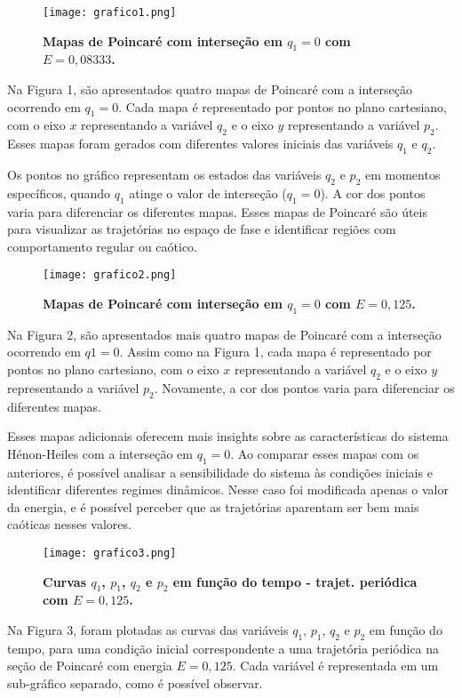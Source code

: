\documentclass[a4paper,12pt]{article}
\begin{document}
\begin{figure}[H]
\centering
\texttt{[image: grafico1.png]}
\caption{\textbf{Mapas de Poincaré com interseção em $q_1 = 0$ com $E = 0,08333$.}}
\end{figure}

Na Figura 1, são apresentados quatro mapas de Poincaré com a interseção ocorrendo em $q_1 = 0$. Cada mapa é representado por pontos no plano cartesiano, com o eixo $x$ representando a variável $q_2$ e o eixo $y$ representando a variável $p_2$. Esses mapas foram gerados com diferentes valores iniciais das variáveis $q_1$ e $q_2$.

Os pontos no gráfico representam os estados das variáveis $q_2$ e $p_2$ em momentos específicos, quando $q_1$ atinge o valor de interseção ($q_1 = 0$). A cor dos pontos varia para diferenciar os diferentes mapas. Esses mapas de Poincaré são úteis para visualizar as trajetórias no espaço de fase e identificar regiões com comportamento regular ou caótico.


\begin{figure}[H]
\centering
\texttt{[image: grafico2.png]}
\caption{\textbf{Mapas de Poincaré com interseção em $q_1 = 0$ com $E = 0,125$.}}
\end{figure}

Na Figura 2, são apresentados mais quatro mapas de Poincaré com a interseção ocorrendo em $q1 = 0$. Assim como na Figura 1, cada mapa é representado por pontos no plano cartesiano, com o eixo $x$ representando a variável $q_2$ e o eixo $y$ representando a variável $p_2$. Novamente, a cor dos pontos varia para diferenciar os diferentes mapas.

Esses mapas adicionais oferecem mais insights sobre as características do sistema Hénon-Heiles com a interseção em $q_1 = 0$. Ao comparar esses mapas com os anteriores, é possível analisar a sensibilidade do sistema às condições iniciais e identificar diferentes regimes dinâmicos. Nesse caso foi modificada apenas o valor da energia, e é possível perceber que as trajetórias aparentam ser bem mais caóticas nesses valores.

\begin{figure}[H]
\centering
\texttt{[image: grafico3.png]}
\caption{\textbf{Curvas $q_1$, $p_1$, $q_2$ e $p_2$ em função do tempo - trajet. periódica com $E = 0,125$.}}
\end{figure}

Na Figura 3, foram plotadas as curvas das variáveis $q_1$, $p_1$, $q_2$ e $p_2$ em função do tempo, para uma condição inicial correspondente a uma trajetória periódica na seção de Poincaré com energia $E = 0,125$. Cada variável é representada em um sub-gráfico separado, como é possível observar.
\end{document}
